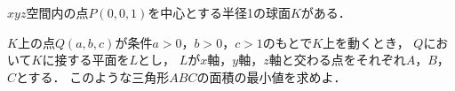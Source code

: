 \documentclass[../../main.tex]{subfiles}
\begin{document}
$xyz$空間内の点$P(0,0,1)$を中心とする半径1の球面$K$がある．

$K$上の点$Q(a,b,c)$が条件$a>0$，$b>0$，$c>1$のもとで$K$上を動くとき，
$Q$において$K$に接する平面を$L$とし，
$L$が$x$軸，$y$軸，$z$軸と交わる点をそれぞれ$A$，$B$，$C$とする．
このような三角形$ABC$の面積の最小値を求めよ．
\end{document}

